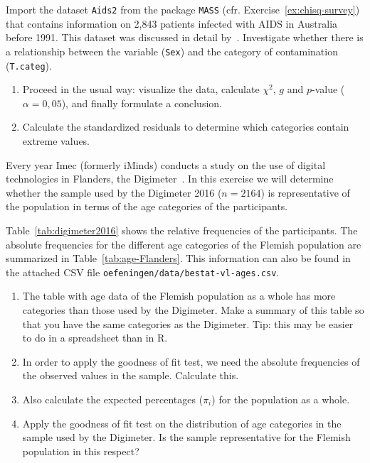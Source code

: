 \begin{exercise}
  \label{ex:chisq-aids2}
  Import the dataset \texttt{Aids2} from the package \texttt{MASS} (cfr. Exercise~\ref{ex:chisq-survey}) that contains information on 2,843 patients infected with AIDS in Australia before 1991. This dataset was discussed in detail by~\textcite{Ripley2007}. Investigate whether there is a relationship between the variable (\texttt{Sex}) and the category of contamination (\texttt{T.categ}).
  
  \begin{enumerate}
    \item Proceed in the usual way: visualize the data, calculate $\chi^2$, $g$ and $p$-value ($\alpha = 0,05$), and finally formulate a conclusion.
    \item Calculate the standardized residuals to determine which categories contain extreme values.
  \end{enumerate}
  
\end{exercise}

\begin{exercise}
  \label{ex:chisq-digimeter}
  
  Every year Imec (formerly iMinds) conducts a study on the use of digital technologies in Flanders, the Digimeter~\autocite{Vanhaelewyn2016}. In this exercise we will determine whether the sample used by the Digimeter 2016 ($n = 2164$) is representative of the population in terms of the age categories of the participants.
  
  Table~\ref{tab:digimeter2016} shows the relative frequencies of the participants. The absolute frequencies for the different age categories of the Flemish population are summarized in Table~\ref{tab:age-Flanders}. This information can also be found in the attached CSV file \texttt{oefeningen/data/bestat-vl-ages.csv}.
  
  \begin{enumerate}
    \item The table with age data of the Flemish population as a whole has more categories than those used by the Digimeter. Make a summary of this table so that you have the same categories as the Digimeter. Tip: this may be easier to do in a spreadsheet than in R.
    \item In order to apply the goodness of fit test, we need the absolute frequencies of the observed values in the sample. Calculate this.
    \item Also calculate the expected percentages ($\pi_{i}$) for the population as a whole.
    \item Apply the goodness of fit test on the distribution of age categories in the sample used by the Digimeter. Is the sample representative for the Flemish population in this respect?
  \end{enumerate}
\end{exercise}

